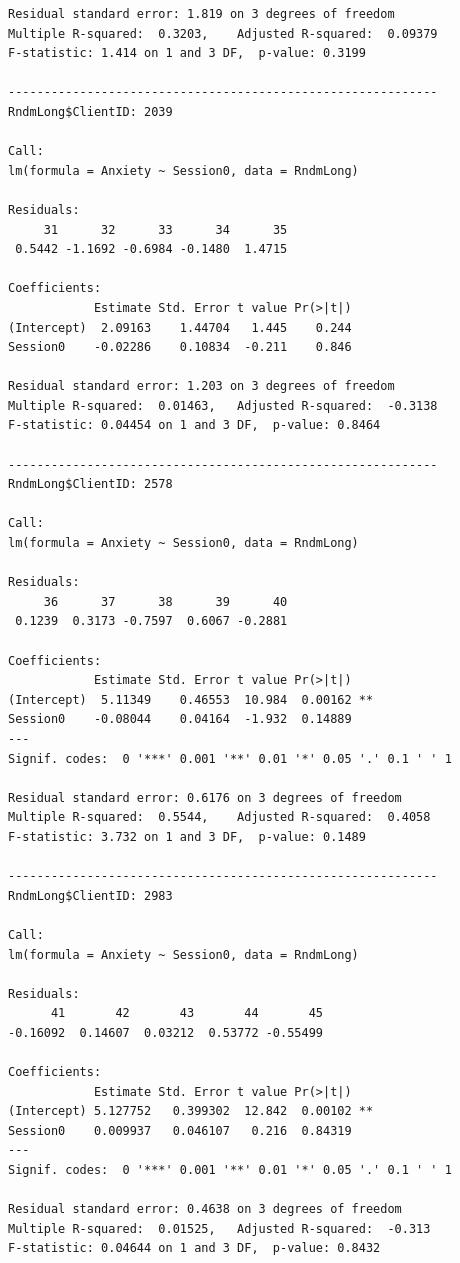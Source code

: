 \documentclass[
  english,
]{book}
\begin{document}
\begin{verbatim}
Residual standard error: 1.819 on 3 degrees of freedom
Multiple R-squared:  0.3203,    Adjusted R-squared:  0.09379 
F-statistic: 1.414 on 1 and 3 DF,  p-value: 0.3199

------------------------------------------------------------ 
RndmLong$ClientID: 2039

Call:
lm(formula = Anxiety ~ Session0, data = RndmLong)

Residuals:
     31      32      33      34      35 
 0.5442 -1.1692 -0.6984 -0.1480  1.4715 

Coefficients:
            Estimate Std. Error t value Pr(>|t|)
(Intercept)  2.09163    1.44704   1.445    0.244
Session0    -0.02286    0.10834  -0.211    0.846

Residual standard error: 1.203 on 3 degrees of freedom
Multiple R-squared:  0.01463,   Adjusted R-squared:  -0.3138 
F-statistic: 0.04454 on 1 and 3 DF,  p-value: 0.8464

------------------------------------------------------------ 
RndmLong$ClientID: 2578

Call:
lm(formula = Anxiety ~ Session0, data = RndmLong)

Residuals:
     36      37      38      39      40 
 0.1239  0.3173 -0.7597  0.6067 -0.2881 

Coefficients:
            Estimate Std. Error t value Pr(>|t|)   
(Intercept)  5.11349    0.46553  10.984  0.00162 **
Session0    -0.08044    0.04164  -1.932  0.14889   
---
Signif. codes:  0 '***' 0.001 '**' 0.01 '*' 0.05 '.' 0.1 ' ' 1

Residual standard error: 0.6176 on 3 degrees of freedom
Multiple R-squared:  0.5544,    Adjusted R-squared:  0.4058 
F-statistic: 3.732 on 1 and 3 DF,  p-value: 0.1489

------------------------------------------------------------ 
RndmLong$ClientID: 2983

Call:
lm(formula = Anxiety ~ Session0, data = RndmLong)

Residuals:
      41       42       43       44       45 
-0.16092  0.14607  0.03212  0.53772 -0.55499 

Coefficients:
            Estimate Std. Error t value Pr(>|t|)   
(Intercept) 5.127752   0.399302  12.842  0.00102 **
Session0    0.009937   0.046107   0.216  0.84319   
---
Signif. codes:  0 '***' 0.001 '**' 0.01 '*' 0.05 '.' 0.1 ' ' 1

Residual standard error: 0.4638 on 3 degrees of freedom
Multiple R-squared:  0.01525,   Adjusted R-squared:  -0.313 
F-statistic: 0.04644 on 1 and 3 DF,  p-value: 0.8432


\end{verbatim}
\end{document}
